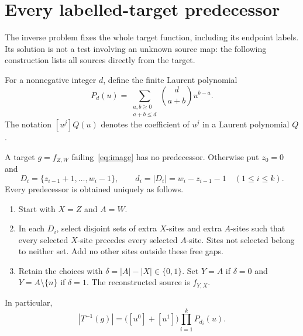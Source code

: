 \section{Every labelled-target predecessor}\label{sec:inverse}

The inverse problem fixes the whole target function, including its
endpoint labels. Its solution is not a test involving an unknown source
map: the following construction lists all sources directly from the
target.

For a nonnegative integer $d$, define the finite Laurent polynomial
\begin{equation}\label{eq:gap_poly}
 P_d(u)=\sum_{\substack{a,b\ge0\\a+b\le d}}
             \binom{d}{a+b}u^{b-a}.
\end{equation}
The notation $[u^j]Q(u)$ denotes the coefficient of $u^j$ in a Laurent
polynomial $Q$.

\begin{theorem}\label{thm:inverse}
A target $g=f_{Z,W}$ failing~\eqref{eq:image} has no predecessor.
Otherwise put $z_0=0$ and
\[
 D_i=\{z_{i-1}+1,\ldots,w_i-1\},\qquad
 d_i=|D_i|=w_i-z_{i-1}-1\quad(1\le i\le k).
\]
Every predecessor is obtained uniquely as follows.
\begin{enumerate}
\item Start with $X=Z$ and $A=W$.
\item In each $D_i$, select disjoint sets of extra $X$-sites and extra
      $A$-sites such that every selected $X$-site precedes every selected
      $A$-site. Sites not selected belong to neither set. Add no other
      sites outside these free gaps.
\item Retain the choices with $\delta=|A|-|X|\in\{0,1\}$. Set
      $Y=A$ if $\delta=0$ and $Y=A\setminus\{n\}$ if $\delta=1$.
      The reconstructed source is $f_{Y,X}$.
\end{enumerate}
In particular,
\begin{equation}\label{eq:fibre}
 |T^{-1}(g)|=\bigl([u^0]+[u^1]\bigr)
                    \prod_{i=1}^{k}P_{d_i}(u).
\end{equation}
\end{theorem}

